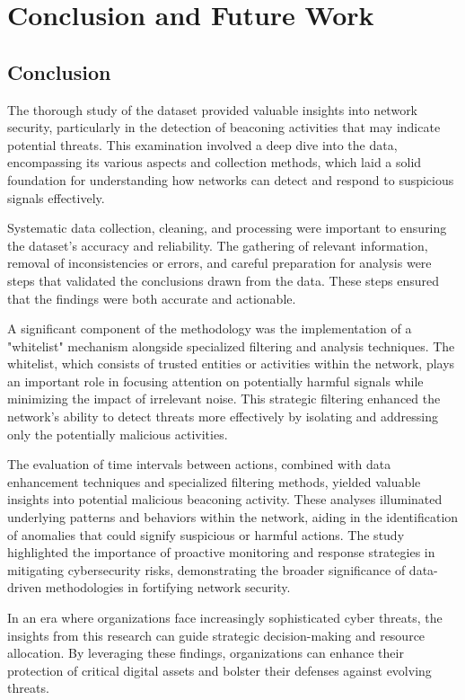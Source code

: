 \chapter{Conclusion and Future Work}
\section{Conclusion}

The thorough study of the dataset provided valuable insights into network security, particularly in the detection of beaconing activities that may indicate potential threats. This examination involved a deep dive into the data, encompassing its various aspects and collection methods, which laid a solid foundation for understanding how networks can detect and respond to suspicious signals effectively.

Systematic data collection, cleaning, and processing were important to ensuring the dataset’s accuracy and reliability. The gathering of relevant information, removal of inconsistencies or errors, and careful preparation for analysis were  steps that validated the conclusions drawn from the data. These steps ensured that the findings were both accurate and actionable.

A significant component of the methodology was the implementation of a "whitelist" mechanism alongside specialized filtering and analysis techniques. The whitelist, which consists of trusted entities or activities within the network, plays an important role in focusing attention on potentially harmful signals while minimizing the impact of irrelevant noise. This strategic filtering enhanced the network’s ability to detect threats more effectively by isolating and addressing only the potentially malicious activities.

The evaluation of time intervals between actions, combined with data enhancement techniques and specialized filtering methods, yielded valuable insights into potential malicious beaconing activity. These analyses illuminated underlying patterns and behaviors within the network, aiding in the identification of anomalies that could signify suspicious or harmful actions. The study highlighted the importance of proactive monitoring and response strategies in mitigating cybersecurity risks, demonstrating the broader significance of data-driven methodologies in fortifying network security.

In an era where organizations face increasingly sophisticated cyber threats, the insights from this research can guide strategic decision-making and resource allocation. By leveraging these findings, organizations can enhance their protection of critical digital assets and bolster their defenses against evolving threats.

